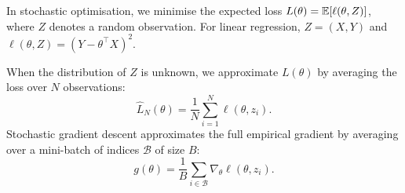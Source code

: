\begin{figure}
    \centering
    \resizebox{0.81\linewidth}{!}{}
\end{figure}

In stochastic optimisation, we minimise the expected loss $L(\theta)=\operatorname{\mathbb{E}}[\ell(\theta,Z)]$, where $Z$ denotes a random observation. For linear regression, $Z=(X,Y)$ and $\ell(\theta,Z)=(Y-\theta^\top X)^2$.

When the distribution of $Z$ is unknown, we approximate $L(\theta)$ by averaging the loss over $N$ observations:
\[
    \widehat L_N(\theta)=\frac{1}{N}\sum_{i=1}^N\ell(\theta,z_i).
\]
Stochastic gradient descent approximates the full empirical gradient by averaging over a mini-batch of indices $\mathcal B$ of size $B$:
\[
    g(\theta)=\frac{1}{B}\sum_{i\in\mathcal B}\nabla_\theta\ell(\theta,z_i).
\]

